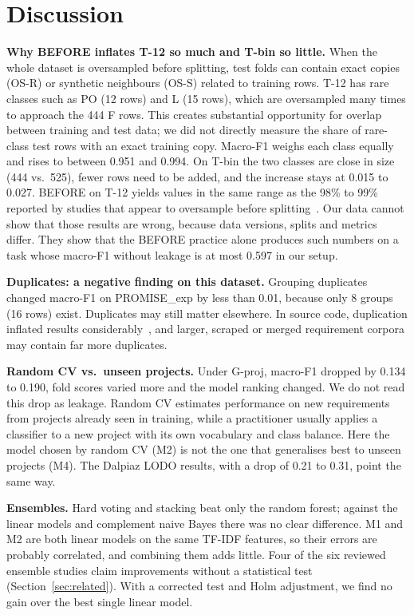 \section{Discussion}
\label{sec:discussion}

\textbf{Why BEFORE inflates T-12 so much and T-bin so little.} When the whole dataset is oversampled before splitting, test folds can contain exact copies (OS-R) or synthetic neighbours (OS-S) related to training rows. T-12 has rare classes such as PO (12 rows) and L (15 rows), which are oversampled many times to approach the 444 F rows. This creates substantial opportunity for overlap between training and test data; we did not directly measure the share of rare-class test rows with an exact training copy. Macro-F1 weighs each class equally and rises to between 0.951 and 0.994. On T-bin the two classes are close in size (444 vs.\ 525), fewer rows need to be added, and the increase stays at 0.015 to 0.027. BEFORE on T-12 yields values in the same range as the 98\% to 99\% reported by studies that appear to oversample before splitting~\cite{metu2024hybrid,baskoro2021systematic}. Our data cannot show that those results are wrong, because data versions, splits and metrics differ. They show that the BEFORE practice alone produces such numbers on a task whose macro-F1 without leakage is at most 0.597 in our setup.

\textbf{Duplicates: a negative finding on this dataset.} Grouping duplicates changed macro-F1 on PROMISE\_exp by less than 0.01, because only 8 groups (16 rows) exist. Duplicates may still matter elsewhere. In source code, duplication inflated results considerably~\cite{allamanis2019adverse}, and larger, scraped or merged requirement corpora may contain far more duplicates.

\textbf{Random CV vs.\ unseen projects.} Under G-proj, macro-F1 dropped by 0.134 to 0.190, fold scores varied more and the model ranking changed. We do not read this drop as leakage. Random CV estimates performance on new requirements from projects already seen in training, while a practitioner usually applies a classifier to a new project with its own vocabulary and class balance. Here the model chosen by random CV (M2) is not the one that generalises best to unseen projects (M4). The Dalpiaz LODO results, with a drop of 0.21 to 0.31, point the same way.

\textbf{Ensembles.} Hard voting and stacking beat only the random forest; against the linear models and complement naive Bayes there was no clear difference. M1 and M2 are both linear models on the same TF-IDF features, so their errors are probably correlated, and combining them adds little. Four of the six reviewed ensemble studies claim improvements without a statistical test (Section~\ref{sec:related}). With a corrected test and Holm adjustment, we find no gain over the best single linear model.

